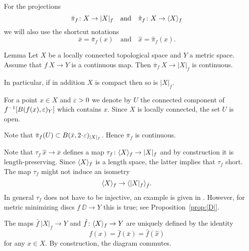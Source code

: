 \documentclass{article}
\begin{document}
For the projections 
\[\bar \pi_f\colon X\to |X|_f\quad\text{and}\quad \hat \pi_f\colon X\to \langle X\rangle_f\]
we will also use the shortcut notations 
\[\bar x=\bar\pi_f(x) \quad\text{and}\quad  \hat x= \hat \pi_f(x).\]

\begin{thm}{Lemma}\label{lem:picont}
Let $X$ be a locally connected topological space and $Y$ a metric space. Assume that $f\:X\to Y$ is a continuous map. 
Then $\bar\pi_f\:X\to|X|_f$ is continuous.

In particular, if in addition $X$ is compact then so is $|X|_f$.
\end{thm}

For a point $x\in X$ and $\varepsilon>0$ we denote by $U$ the connected component of $f^{-1}[B(f(x),\varepsilon)_{Y}]$ which contains $x$.
Since $X$ is locally connected, the set $U$ is open.

Note that $\bar\pi_f(U)\subset B(\bar x,2\cdot \eps)_{|X|_f}$. Hence
$\bar\pi_f$ is continuous.
\qeds



\begin{wrapfigure}{r}{33 mm}
\end{wrapfigure}

Note that $\tau_f\: \hat x\to \bar x$ defines a map $\tau_f\colon \langle X\rangle_f\to |X|_f$ and by construction it is length-preserving.
Since $\langle X\rangle_f$ is a length space, the latter implies that $\tau_f$ short.
The map $\tau_f$ might not induce an isometry
\[\langle X\rangle_f\to\langle|X|_f\rangle_{\bar f}.\]
In general $\tau_f$ does not have to be injective, an example is given in \cite[4.2]{petrunin-intrinisic}.
However, for metric minimizing discs $f\:\DD\to Y$ this is true; see
Proposition~\ref{prop:|D|}.

The maps $\bar f\:|X|_f\to Y$ and $ \hat f\colon\langle X\rangle_f\to Y$ are uniquely defined by the identity
\[f(x)=\bar f(\bar x)=  \hat f( \hat x)\] for any $x\in X$.
By construction, the diagram commutes.
\end{document}
